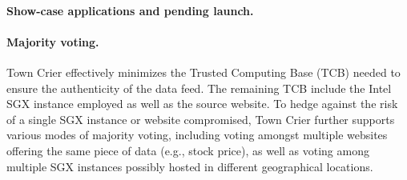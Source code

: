 \paragraph{Show-case applications and pending launch.}



\paragraph{Majority voting.}
Town Crier effectively minimizes the 
Trusted Computing Base (TCB) needed to ensure
the authenticity of the data feed.
The remaining TCB include the Intel SGX 
instance employed as well as the source website. 
To hedge against the risk of a single SGX instance
or website compromised, Town Crier further supports 
various modes of majority voting,  
including voting amongst multiple 
websites offering the same piece of data (e.g., stock price),  
as well as voting among multiple SGX instances possibly
hosted in different geographical locations.




